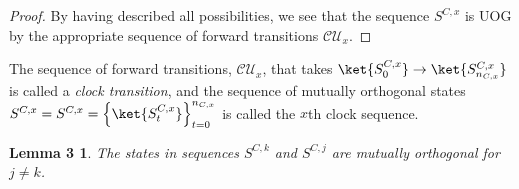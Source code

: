\documentclass[11pt,letterpaper]{article}
\newtheorem*{lem3}{Lemma 3}
\newcommand{\<}{\langle}
\renewcommand{\>}{\rangle}
\begin{document}
\begin{proof}
By having described all possibilities, we see that the sequence $S^{C,x}$ is UOG by the appropriate sequence of forward transitions $\mathcal{CU}_{x}$.
\end{proof}
The sequence of forward transitions, $\mathcal{CU}_{x}$, that takes $\ket{S^{C,x}_0}\to\ket{S^{C,x}_{n_{C,x}}}$ is called a \emph{clock transition}, and the sequence of mutually orthogonal states $S^{C,x}=S^{C,x}=\left\{\ket{S^{C,x}_t}\right\}_{t= 0}^{n_{C,x}}$ is called the $x$th clock sequence.
\begin{lem3}
The states in sequences $S^{C,k}$ and $S^{C,j}$ are mutually orthogonal for $j\neq k$.
\end{lem3}
\end{document}
